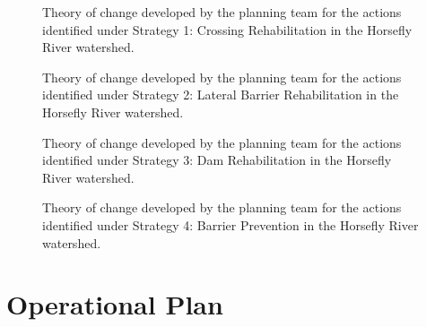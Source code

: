 \documentclass[
  letterpaper,
  DIV=11,
  numbers=noendperiod]{scrreprt}
\begin{document}
\begin{figure}


\caption{\label{fig-stra1}Theory of change developed by the planning
team for the actions identified under Strategy 1: Crossing
Rehabilitation in the Horsefly River watershed.}

\end{figure}%

\begin{figure}


\caption{\label{fig-stra2}Theory of change developed by the planning
team for the actions identified under Strategy 2: Lateral Barrier
Rehabilitation in the Horsefly River watershed.}

\end{figure}%

\begin{figure}


\caption{\label{fig-stra3}Theory of change developed by the planning
team for the actions identified under Strategy 3: Dam Rehabilitation in
the Horsefly River watershed.}

\end{figure}%

\begin{figure}


\caption{\label{fig-stra4}Theory of change developed by the planning
team for the actions identified under Strategy 4: Barrier Prevention in
the Horsefly River watershed.}

\end{figure}%

\section*{Operational Plan}\label{operational-plan-1}
\end{document}
